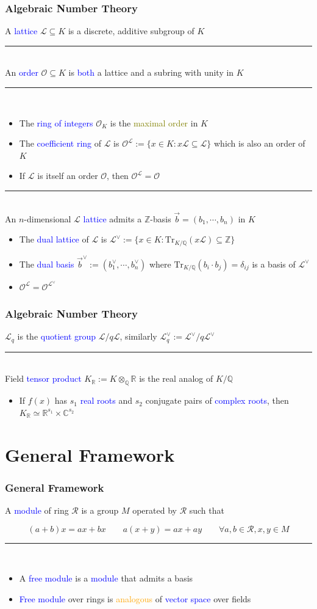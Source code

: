\documentclass{beamer}
\newcommand{\blue}[1]{\textcolor{blue}{#1}}
\newcommand{\dgreen}[1]{\textcolor{dgreen}{#1}}
\newcommand{\orange}[1]{\textcolor{orange}{#1}}
\newcommand{\olive}[1]{\textcolor{olive}{#1}}
\newcommand{\cL}{\mathcal{L}}
\newcommand{\cO}{\mathcal{O}}
\newcommand{\cR}{\mathcal{R}}
\newcommand{\bbC}{\mathbb{C}}
\newcommand{\bbQ}{\mathbb{Q}}
\newcommand{\bbR}{\mathbb{R}}
\newcommand{\bbZ}{\mathbb{Z}}
\newcommand{\TrKQ}{\mathrm{Tr}_{K/\mathbb{Q}}}
\newcommand{\cOL}{\mathcal{O}^{\mathcal{L}}}
\newcommand{\cLV}{\mathcal{L}^{\vee}}
\newcommand{\KR}{K_{\mathbb{R}}}
\newcommand{\vb}{\vec{b}}
\newcommand{\vbV}{\vec{b}^{\vee}}
\newcommand{\divline}{\noindent\rule{6cm}{0.4pt}}
\begin{document}
\frame
{
  \frametitle{Algebraic Number Theory}
  A \blue{lattice} $\cL\subseteq K$ is a \dgreen{discrete}, \dgreen{additive subgroup} of $K$

  \noindent\rule{6cm}{0.4pt}\\
  An \blue{order} $\cO\subseteq K$ is \blue{both} a \dgreen{lattice} and a \dgreen{subring with unity} in $K$

  \noindent\rule{6cm}{0.4pt}\\
  \begin{itemize}
  	\item The \blue{ring of integers} $\cO_K$ is the \olive{maximal order} in $K$
  	\item The \blue{coefficient ring} of $\cL$ is $\cOL:=\{x\in K:x\cL\subseteq\cL\}$ which is \dgreen{also an order} of $K$
  	\item If $\cL$ is itself an order $\cO$, then $\cOL=\cO$
  \end{itemize}

  \noindent\rule{6cm}{0.4pt}\\
  An $n$-dimensional $\cL$ \blue{lattice} admits a \dgreen{$\bbZ$-basis} $\vb=(b_1,\cdots,b_n)$ in $K$
  \begin{itemize}
  	\item The \blue{dual lattice} of $\cL$ is $\cLV:=\{x\in K:\TrKQ(x\cL)\subseteq\bbZ\}$
  	\item The \blue{dual basis} $\vbV:=(b_1^{\vee},\cdots,b_n^{\vee})$ where $\TrKQ(b_i\cdot b_j)=\delta_{ij}$ \dgreen{is a basis of} $\cLV$
  	\item $\cOL=\cO^{\cLV}$
  \end{itemize}
}

\frame
{
  \frametitle{Algebraic Number Theory}
  $\cL_q$ is the \blue{quotient group} $\cL/q\cL$, similarly $\cLV_q:=\cLV/q\cLV$

  \divline\\

  Field \blue{tensor product} $\KR:=K\otimes_{\bbQ}\bbR$ is the \dgreen{real analog} of $K/\bbQ$
  \begin{itemize}
  	\item If $f(x)$ has $s_1$ \blue{real roots} and $s_2$ conjugate pairs of \blue{complex roots}, then $\KR\simeq\bbR^{s_1}\times\bbC^{s_2}$
  \end{itemize}
}

\section{General Framework}
\frame
{
  \frametitle{General Framework}

  A \blue{module} of ring $\cR$ is a group $M$ operated by $\cR$ such that

  \[(a+b)x=ax+bx\qquad a(x+y)=ax+ay\qquad\forall a,b\in\cR,x,y\in M\]
  \divline\\

  \begin{itemize}
  	\item A \blue{free module} is a \blue{module} that admits a \dgreen{basis}
  	\item \blue{Free module} over rings is \orange{analogous} of \blue{vector space} over fields
  \end{itemize}
}
\end{document}
